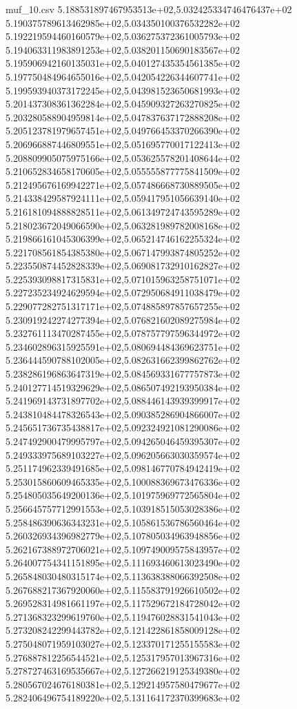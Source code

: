 \begin{filecontents*}{muf_10.csv}
5.188531897467953513e+02,5.032425334746476437e+02
5.190375789613462985e+02,5.034350100376532282e+02
5.192219594460160579e+02,5.036275372361005793e+02
5.194063311983891253e+02,5.038201150690183567e+02
5.195906942160135031e+02,5.040127435354561385e+02
5.197750484964655016e+02,5.042054226344607741e+02
5.199593940373172245e+02,5.043981523650681993e+02
5.201437308361362284e+02,5.045909327263270825e+02
5.203280588904959814e+02,5.047837637172888208e+02
5.205123781979657451e+02,5.049766453370266390e+02
5.206966887446809551e+02,5.051695770017122413e+02
5.208809905075975166e+02,5.053625578201408644e+02
5.210652834658170605e+02,5.055555877775841509e+02
5.212495676169942271e+02,5.057486668730889505e+02
5.214338429587924111e+02,5.059417951056639140e+02
5.216181094888828511e+02,5.061349724743595289e+02
5.218023672049066590e+02,5.063281989782008168e+02
5.219866161045306399e+02,5.065214746162255324e+02
5.221708561854385380e+02,5.067147993874805252e+02
5.223550874452828339e+02,5.069081732910162827e+02
5.225393098817315831e+02,5.071015963258751071e+02
5.227235234924629594e+02,5.072950684911038479e+02
5.229077282751317171e+02,5.074885897857657255e+02
5.230919242274277394e+02,5.076821602089275984e+02
5.232761113470287455e+02,5.078757797596344972e+02
5.234602896315925591e+02,5.080694484369623751e+02
5.236444590788102005e+02,5.082631662399862762e+02
5.238286196863647319e+02,5.084569331677757873e+02
5.240127714519329629e+02,5.086507492193950384e+02
5.241969143731897702e+02,5.088446143939399917e+02
5.243810484478326543e+02,5.090385286904866007e+02
5.245651736735438817e+02,5.092324921081290086e+02
5.247492900479995797e+02,5.094265046459395307e+02
5.249333975689103227e+02,5.096205663030359574e+02
5.251174962339491685e+02,5.098146770784942419e+02
5.253015860609465335e+02,5.100088369673476336e+02
5.254805035649200136e+02,5.101975969772565804e+02
5.256645757712991553e+02,5.103918515053028386e+02
5.258486390636343231e+02,5.105861536786560464e+02
5.260326934396982779e+02,5.107805034963948856e+02
5.262167388972706021e+02,5.109749009575843957e+02
5.264007754341151895e+02,5.111693460613023490e+02
5.265848030480315174e+02,5.113638388066392508e+02
5.267688217367920060e+02,5.115583791926610502e+02
5.269528314981661197e+02,5.117529672184728042e+02
5.271368323299619760e+02,5.119476028831541043e+02
5.273208242299443782e+02,5.121422861858009128e+02
5.275048071959103027e+02,5.123370171255155583e+02
5.276887812256544521e+02,5.125317957013967316e+02
5.278727463169535667e+02,5.127266219125349380e+02
5.280567024676180381e+02,5.129214957580479677e+02
5.282406496754189220e+02,5.131164172370399683e+02

\end{filecontents*}
